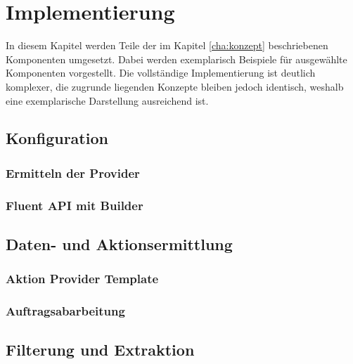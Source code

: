 \chapter{Implementierung}
\label{cha:implementierung}
In diesem Kapitel werden Teile der im Kapitel \ref{cha:konzept} beschriebenen Komponenten umgesetzt. Dabei werden exemplarisch Beispiele für ausgewählte Komponenten vorgestellt.  
Die vollständige Implementierung ist deutlich komplexer, die zugrunde liegenden Konzepte bleiben jedoch identisch, weshalb eine exemplarische Darstellung ausreichend ist.

\section{Konfiguration}
\label{sec:configuration_impl}

\subsection{Ermitteln der Provider}

\subsection{Fluent API mit Builder}

\section{Daten- und Aktionsermittlung}
\label{sec:data_collection_impl}

\subsection{Aktion Provider Template}

\subsection{Auftragsabarbeitung}

\section{Filterung und Extraktion}
\label{sec:data_extraction_impl}


